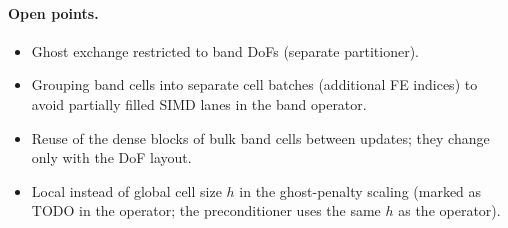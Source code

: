 \documentclass[11pt,a4paper]{article}
\begin{document}
\paragraph{Open points.}
\begin{itemize}[leftmargin=*]
  \item Ghost exchange restricted to band DoFs (separate partitioner).
  \item Grouping band cells into separate cell batches (additional FE indices) to avoid partially
        filled SIMD lanes in the band operator.
  \item Reuse of the dense blocks of bulk band cells between updates; they change only with the DoF
        layout.
  \item Local instead of global cell size $h$ in the ghost-penalty scaling (marked as TODO in the
        operator; the preconditioner uses the same $h$ as the operator).
\end{itemize}
\end{document}
